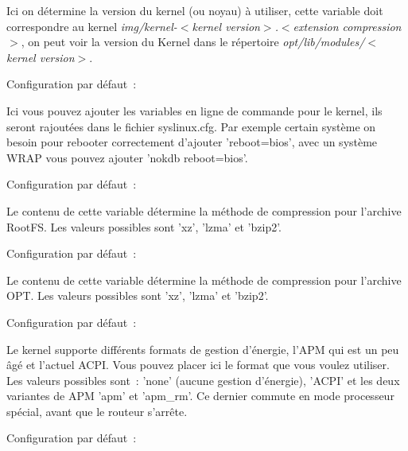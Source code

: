 \begin{description}

  Ici on détermine la version du kernel (ou noyau) à utiliser, cette variable
  doit correspondre au kernel \emph{img/kernel-$<$kernel version$>$.$<$extension
  compression$>$}, on peut voir la version du Kernel dans le répertoire
  \emph{opt/lib/modules/$<$kernel version$>$}.


  Configuration par défaut~: 

  Ici vous pouvez ajouter les variables en ligne de commande pour le kernel,
  ils seront rajoutées dans le fichier syslinux.cfg. Par exemple certain système
  on besoin pour rebooter correctement d'ajouter 'reboot=bios', avec un système
  WRAP vous pouvez ajouter 'nokdb reboot=bios'.


  Configuration par défaut~: 

  Le contenu de cette variable détermine la méthode de compression pour
  l'archive RootFS. Les valeurs possibles sont 'xz', 'lzma' et 'bzip2'.


  Configuration par défaut~: 

  Le contenu de cette variable détermine la méthode de compression pour
  l'archive OPT. Les valeurs possibles sont 'xz', 'lzma' et 'bzip2'.

  
  Configuration par défaut~: 

  {Le kernel supporte différents formats de gestion d'énergie, l'APM qui est un
  peu âgé et l'actuel ACPI. Vous pouvez placer ici le format que vous voulez
  utiliser. Les valeurs possibles sont~: 'none' (aucune gestion d'énergie),
  'ACPI' et les deux variantes de APM 'apm' et 'apm\_rm'. Ce dernier commute
  en mode processeur spécial, avant que le routeur s'arrête.}


  Configuration par défaut~: 


\end{description}
